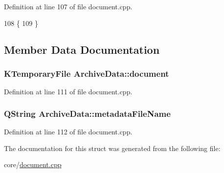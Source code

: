 Definition at line 107 of file document.\+cpp.


\begin{DoxyCode}
108     \{
109     \}
\end{DoxyCode}


\subsection{Member Data Documentation}
\hypertarget{structArchiveData_aeeeafd3c5edcd003dc379c7aa90c11e2}{
\subsubsection[{document}]{\setlength{\rightskip}{0pt plus 5cm}K\+Temporary\+File Archive\+Data\+::document}}\label{structArchiveData_aeeeafd3c5edcd003dc379c7aa90c11e2}


Definition at line 111 of file document.\+cpp.

\hypertarget{structArchiveData_aed05c74b518d7f05506d14c32cc46846}{
\subsubsection[{metadata\+File\+Name}]{\setlength{\rightskip}{0pt plus 5cm}Q\+String Archive\+Data\+::metadata\+File\+Name}}\label{structArchiveData_aed05c74b518d7f05506d14c32cc46846}


Definition at line 112 of file document.\+cpp.



The documentation for this struct was generated from the following file\+:\begin{DoxyCompactItemize}
\item 
core/\hyperlink{core_2document_8cpp}{document.\+cpp}\end{DoxyCompactItemize}
